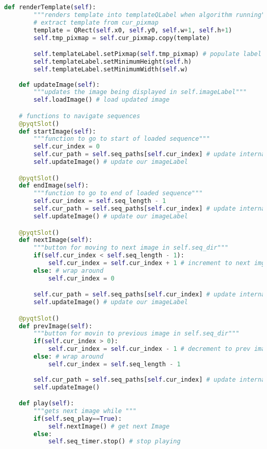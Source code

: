\begin{lstlisting}[language=Python, caption={GUI Impementation Code}, captionpos=b, label={lst:gui}]
    def renderTemplate(self):
        """renders template into templateQLabel when algorithm running"""
        # extract template from cur_pixmap
        template = QRect(self.x0, self.y0, self.w+1, self.h+1)
        self.tmp_pixmap = self.cur_pixmap.copy(template)

        self.templateLabel.setPixmap(self.tmp_pixmap) # populate label
        self.templateLabel.setMinimumHeight(self.h)
        self.templateLabel.setMinimumWidth(self.w)
        
    def updateImage(self):
        """updates the image being displayed in self.imageLabel"""
        self.loadImage() # load updated image

    # functions to navigate sequences
    @pyqtSlot()
    def startImage(self):
        """function to go to start of loaded sequence"""
        self.cur_index = 0
        self.cur_path = self.seq_paths[self.cur_index] # update internal current image path
        self.updateImage() # update our imageLabel

    @pyqtSlot()
    def endImage(self):
        """function to go to end of loaded sequence"""
        self.cur_index = self.seq_length - 1
        self.cur_path = self.seq_paths[self.cur_index] # update internal current image path
        self.updateImage() # update our imageLabel

    @pyqtSlot()
    def nextImage(self):
        """button for moving to next image in self.seq_dir"""
        if(self.cur_index < self.seq_length - 1):
            self.cur_index = self.cur_index + 1 # increment to next img
        else: # wrap around
            self.cur_index = 0

        self.cur_path = self.seq_paths[self.cur_index] # update internal current image path
        self.updateImage() # update our imageLabel

    @pyqtSlot()
    def prevImage(self):
        """button for movin to previous image in self.seq_dir"""
        if(self.cur_index > 0):
            self.cur_index = self.cur_index - 1 # decrement to prev image
        else: # wrap around
            self.cur_index = self.seq_length - 1
        
        self.cur_path = self.seq_paths[self.cur_index] # update internal current image path
        self.updateImage()

    def play(self):
        """gets next image while """
        if(self.seq_play==True):
            self.nextImage() # get next Image 
        else:
            self.seq_timer.stop() # stop playing
    

\end{lstlisting}
